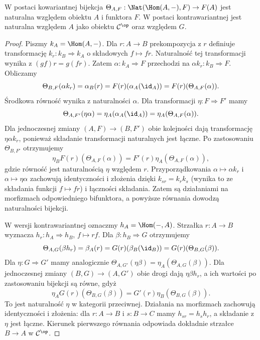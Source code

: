 \begin{twierdzenie}\label{cat:thm:yoneda-natural}
W postaci kowariantnej bijekcja $\Theta_{A,F}:\Nat(\Hom(A,-),F)\to F(A)$ jest naturalna względem obiektu $A$ i funktora $F$. W postaci kontrawariantnej jest naturalna względem $A$ jako obiektu $\mathcal C^{\op}$ oraz względem $G$.
\end{twierdzenie}
\begin{proof}
Piszmy $k_A=\Hom(A,-)$. Dla $r:A\to B$ prekompozycja z $r$ definiuje transformację $k_r:k_B\Rightarrow k_A$ o składowych $f\mapsto fr$. Naturalność tej transformacji wynika z $(gf)r=g(fr)$. Zatem $\alpha:k_A\Rightarrow F$ przechodzi na $\alpha k_r:k_B\Rightarrow F$. Obliczamy
\[
\Theta_{B,F}(\alpha k_r)=\alpha_B(r)
=F(r)(\alpha_A(\id_A))=F(r)(\Theta_{A,F}(\alpha)).
\]
Środkowa równość wynika z naturalności $\alpha$. Dla transformacji $\eta:F\Rightarrow F'$ mamy
\[
\Theta_{A,F'}(\eta\alpha)=\eta_A(\alpha_A(\id_A))
=\eta_A(\Theta_{A,F}(\alpha)).
\]
Dla jednoczesnej zmiany $(A,F)\to(B,F')$ obie kolejności dają transformację $\eta\alpha k_r$, ponieważ składanie transformacji naturalnych jest łączne. Po zastosowaniu $\Theta_{B,F'}$ otrzymujemy
\[
\eta_B F(r)(\Theta_{A,F}(\alpha))
=F'(r)\eta_A(\Theta_{A,F}(\alpha)),
\]
gdzie równość jest naturalnością $\eta$ względem $r$. Przyporządkowania $\alpha\mapsto\alpha k_r$ i $\alpha\mapsto\eta\alpha$ zachowują identyczności i złożenia dzięki $k_{sr}=k_rk_s$ (wynika to ze składania funkcji $f\mapsto fr$) i łączności składania. Zatem są działaniami na morfizmach odpowiedniego bifunktora, a powyższe równania dowodzą naturalności bijekcji.

W wersji kontrawariantnej oznaczmy $h_A=\Hom(-,A)$. Strzałka $r:A\to B$ wyznacza $h_r:h_A\Rightarrow h_B$, $f\mapsto rf$. Dla $\beta:h_B\Rightarrow G$ otrzymujemy
\[
\Theta_{A,G}(\beta h_r)=\beta_A(r)
=G(r)(\beta_B(\id_B))=G(r)(\Theta_{B,G}(\beta)).
\]
Dla $\eta:G\Rightarrow G'$ mamy analogicznie
$\Theta_{A,G'}(\eta\beta)=\eta_A(\Theta_{A,G}(\beta))$.
Dla jednoczesnej zmiany $(B,G)\to(A,G')$ obie drogi dają $\eta\beta h_r$, a ich wartości po zastosowaniu bijekcji są równe, gdyż
\[
\eta_A G(r)(\Theta_{B,G}(\beta))
=G'(r)\eta_B(\Theta_{B,G}(\beta)).
\]
To jest naturalność $\eta$ w kategorii przeciwnej. Działania na morfizmach zachowują identyczności i złożenia: dla $r:A\to B$ i $s:B\to C$ mamy $h_{sr}=h_sh_r$, a składanie z $\eta$ jest łączne. Kierunek pierwszego równania odpowiada dokładnie strzałce $B\to A$ w $\mathcal C^{\op}$.
\end{proof}

